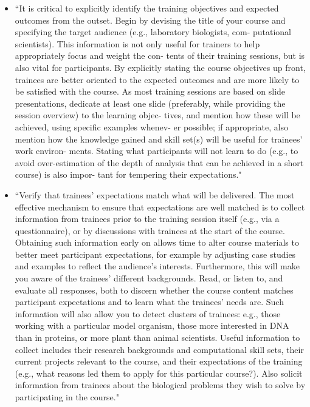 \documentclass[pdftex,english,11pt,parskip=half]{scrartcl}
\begin{document}
\begin{itemize}
\item ``It is critical to explicitly identify the training objectives and expected outcomes from the outset. Begin by devising the title of your course and specifying the target audience (e.g., laboratory biologists, com- putational scientists). This information is not only useful for trainers to help appropriately focus and weight the con- tents of their training sessions, but is also vital for participants. By explicitly stating the course objectives up front, trainees are better oriented to the expected outcomes and are more likely to be satisfied with the course. As most training sessions are based on slide presentations, dedicate at least one slide (preferably, while providing the session overview) to the learning objec- tives, and mention how these will be achieved, using specific examples whenev- er possible; if appropriate, also mention how the knowledge gained and skill set(s) will be useful for trainees’ work environ- ments. Stating what participants will not learn to do (e.g., to avoid over-estimation of the depth of analysis that can be achieved in a short course) is also impor- tant for tempering their expectations." \cite{via2011ten}
\item ``Verify that trainees’ expectations match what will be delivered. The most effective mechanism to ensure that expectations are well matched is to collect information from trainees prior to the training session itself (e.g., via a questionnaire), or by discussions with trainees at the start of the course. Obtaining such information early on allows time to alter course materials to better meet participant expectations, for example by adjusting case studies and examples to reflect the audience’s interests. Furthermore, this will make you aware of the trainees’ different backgrounds. Read, or listen to, and evaluate all responses, both to discern whether the course content matches participant expectations and to learn what the trainees’ needs are. Such information will also allow you to detect clusters of trainees: e.g., those working with a particular model organism, those more interested in DNA than in proteins, or more plant than animal scientists. Useful information to collect includes their research backgrounds and computational skill sets, their current projects relevant to the course, and their expectations of the training (e.g., what reasons led them to apply for this particular course?). Also solicit information from trainees about the biological problems they wish to solve by participating in the course." \cite{via2011ten}

\end{itemize}
\end{document}
